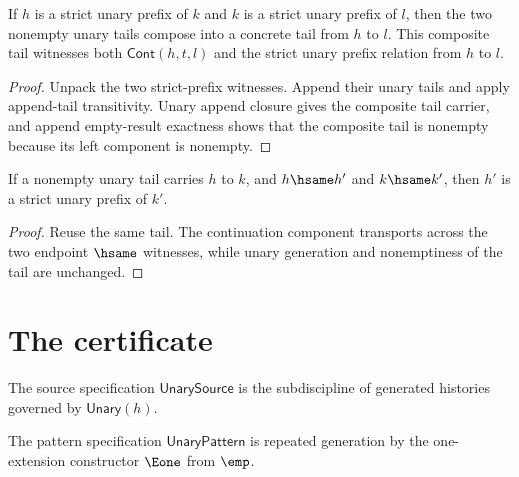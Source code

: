 \begin{theorem}
\label{thm:nat-unary-strict-prefix-trans-composite-tail}
If $h$ is a strict unary prefix of $k$ and $k$ is a strict unary prefix of $l$,
then the two nonempty unary tails compose into a concrete tail from $h$ to
$l$. This composite tail witnesses both $\mathsf{Cont}(h,t,l)$ and the strict
unary prefix relation from $h$ to $l$.
\end{theorem}
\begin{proof}
Unpack the two strict-prefix witnesses. Append their unary tails and apply
append-tail transitivity. Unary append closure gives the composite tail
carrier, and append empty-result exactness shows that the composite tail is
nonempty because its left component is nonempty.
\end{proof}

\begin{theorem}
\label{thm:nat-unary-strict-prefix-cont-hsame-transport}
If a nonempty unary tail carries \(h\) to \(k\), and \(h\hsame h'\) and
\(k\hsame k'\), then \(h'\) is a strict unary prefix of \(k'\).
\end{theorem}
\begin{proof}
Reuse the same tail. The continuation component transports across the two
endpoint \(\hsame\) witnesses, while unary generation and nonemptiness of the
tail are unchanged.
\end{proof}

\section{The certificate}

\begin{definition}
\label{def:unary-source-specification}
The source specification \(\mathsf{UnarySource}\) is the subdiscipline of generated histories governed by \(\mathsf{Unary}(h)\).
\end{definition}

\begin{definition}
\label{def:unary-pattern}
\label{def:unary-pattern-specification}
The pattern specification \(\mathsf{UnaryPattern}\) is repeated generation by the one-extension constructor \(\Eone\) from \(\emp\).
\end{definition}

